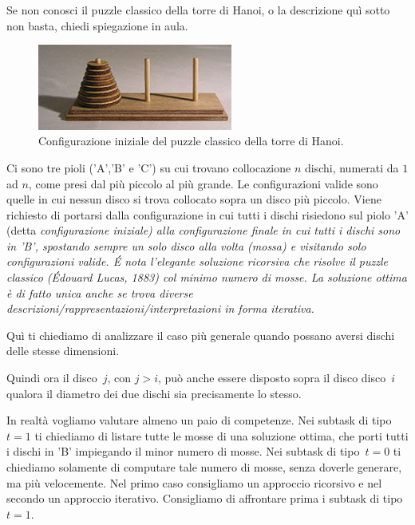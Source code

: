 \renewcommand{\nomebreve}{hanoi\_equal\_disks}
\renewcommand{\titolo}{The Hanoi puzzle with equal disks}

\introduzione{}

Se non conosci il puzzle classico della torre di Hanoi, o la descrizione quì sotto non basta, chiedi spiegazione in aula.

\begin{figure}[h!]
\begin{center}
  \noindent \includegraphics[width=0.57\textwidth]{figures/220px-Tower_of_Hanoi.jpeg}
\end{center}
\caption{Configurazione iniziale del puzzle classico della torre di Hanoi.}
\end{figure}

Ci sono tre pioli ('A','B' e 'C') su cui trovano collocazione $n$ dischi, numerati da $1$ ad $n$, come presi dal più piccolo al più grande. Le configurazioni valide sono quelle in cui nessun disco si trova collocato sopra un disco più piccolo.
Viene richiesto di portarsi dalla configurazione in cui tutti i dischi risiedono sul piolo 'A' (detta \it{configurazione iniziale}) alla \it{configurazione finale} in cui tutti i dischi sono in 'B', spostando sempre un solo disco alla volta (mossa) e visitando solo configurazioni valide.
\'E nota l'elegante soluzione ricorsiva che risolve il puzzle classico (Édouard Lucas, 1883) col minimo numero di mosse. La soluzione ottima è di fatto unica anche se trova diverse descrizioni/rappresentazioni/interpretazioni in forma iterativa.

\begin{center}
\end{center}

Quì ti chiediamo di analizzare il caso più generale quando possano aversi dischi delle stesse dimensioni.

Quindi ora il disco~$j$, con $j>i$, può anche essere disposto sopra il disco disco~$i$ qualora il diametro dei due dischi sia precisamente lo stesso.

In realtà vogliamo valutare almeno un paio di competenze. Nei subtask di tipo~$t=1$ ti chiediamo di listare tutte le mosse di una soluzione ottima, che porti tutti i dischi in 'B' impiegando il minor numero di mosse.
Nei subtask di tipo~$t=0$ ti chiediamo solamente di computare tale numero di mosse, senza doverle generare, ma più velocemente.
Nel primo caso consigliamo un approccio ricorsivo e nel secondo un approccio iterativo.
Consigliamo di affrontare prima i subtask di tipo~$t=1$.


